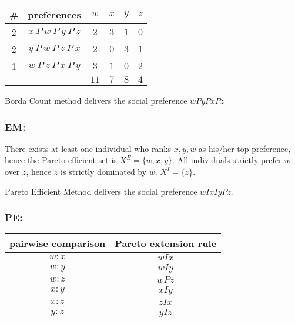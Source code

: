 \documentclass[a4paper]{article}
\begin{document}
\begin{table}[!htbp]
    \centering
    \begin{tabular}{c|c|cccc|}
        \# & preferences                  & $w$  & $x$  & $y$  & $z$ \\ 
        \hline
        2  & $x\: P\: w\: P\: y\: P\: z$  & $2$  & $3$  & $1$  & $0$ \\
        2  & $y\: P\: w\: P\: z\: P\: x$  & $2$  & $0$  & $3$  & $1$ \\
        1  & $w\: P\: z\: P\: x\: P\: y$  & $3$  & $1$  & $0$  & $2$ \\
        \hline
           &                              & $11$ & $7$  & $8$  & $4$ \\
        \hline
    \end{tabular}
\end{table}

Borda Count method delivers the social preference $wPyPxPz$

\subsubsection*{EM:}

There exists at least one individual who ranks $x, y, w$ as his/her top preference, hence the Pareto efficient set is $X^E=\{w, x, y\}$. All individuals strictly prefer $w$ over $z$, hence $z$ is strictly dominated by $w$. $X^I=\{z\}$.

Pareto Efficient Method delivers the social preference $wIxIyPz$.

\subsubsection*{PE:}

\begin{table}[!htbp]
    \centering
    \begin{tabular}{cc}
        pairwise comparison & Pareto extension rule \\
        \hline 
        $w:x$  & $wIx$           \\
        $w:y$  & $wIy$           \\
        $w:z$  & $wPz$           \\
        $x:y$  & $xIy$           \\
        $x:z$  & $zIx$           \\
        $y:z$  & $yIz$           \\
        \hline
    \end{tabular}
\end{table}
\end{document}
